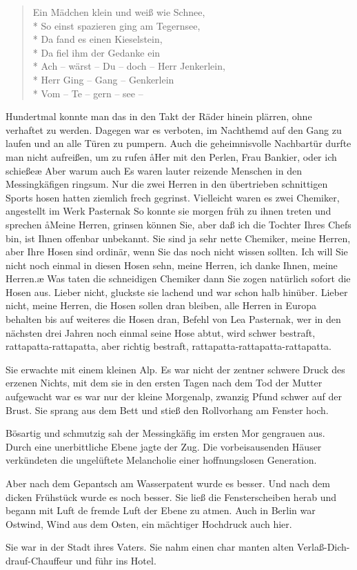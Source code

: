 \begin{verse}Ein Mädchen klein und weiß wie Schnee,\\*
So einst spazieren ging am Tegernsee,\\*
Da fand es einen Kieselstein,\\*
Da fiel ihm der Gedanke ein\dopp{}\\*
Ach -- wärst -- Du -- doch -- Herr Jenkerlein,\\*
Herr Ging -- Gang -- Genkerlein\\*
Vom -- Te -- gern -- see --
\end{verse}

\noindent{}Hundertmal konnte man das in den Takt der Räder hinein\-%
plärren, ohne verhaftet zu werden. Dagegen war es verboten,
im Nachthemd auf den Gang zu laufen und an alle Türen
zu pumpern. Auch die geheimnisvolle Nachbartür durfte
man nicht aufreißen, um zu rufen\dopp{} \aa{}Her mit den Perlen, Frau
Bankier, oder ich schieße\ausr{}\ae{} Aber warum auch\frag{} Es waren
lauter reizende Menschen in den Messingkäfigen ringsum.
Nur die zwei Herren in den übertrieben schnittigen Sports\-%
hosen hatten ziemlich frech gegrinst. Vielleicht waren es zwei
Chemiker, angestellt im Werk Pasternak\frag{} So konnte sie morgen
früh zu ihnen treten und sprechen\dopp{} \aa{}Meine Herren, grinsen
können Sie, aber daß ich die Tochter Ihres Chefs bin, ist
Ihnen offenbar unbekannt. Sie sind ja sehr nette Chemiker,
meine Herren, aber Ihre Hosen sind ordinär, wenn Sie das
noch nicht wissen sollten. Ich will Sie nicht noch einmal in
diesen Hosen sehn, meine Herren, ich danke Ihnen, meine
Herren.\ae{} Was taten die schneidigen Chemiker dann\frag{} Sie
zogen natürlich sofort die Hosen aus. Lieber nicht, gluckste
sie lachend und war schon halb hinüber. Lieber nicht, meine
Herren, die Hosen sollen dran bleiben, alle Herren in Europa
behalten bis auf weiteres die Hosen dran, Befehl von Lea
Pasternak, wer in den nächsten drei Jahren noch einmal seine
Hose abtut, wird schwer bestraft, rattapatta-rattapatta, aber
richtig bestraft, rattapatta-rattapatta-rattapatta.

Sie erwachte mit einem kleinen Alp. Es war nicht der zentner\-%
schwere Druck des erzenen Nichts, mit dem sie in den ersten
Tagen nach dem Tod der Mutter aufgewacht war\semi{} es war
nur der kleine Morgenalp, zwanzig Pfund schwer auf der
Brust. Sie sprang aus dem Bett und stieß den Rollvorhang
am Fenster hoch.

Bösartig und schmutzig sah der Messingkäfig im ersten Mor\-%
gengrauen aus. Durch eine unerbittliche Ebene jagte der Zug.
Die vorbeisausenden Häuser verkündeten die ungelüftete
Melancholie einer hoffnungslosen Generation.

Aber nach dem Gepantsch am Wasserpatent wurde es besser.
Und nach dem dicken Frühstück wurde es noch besser. Sie ließ
die Fensterscheiben herab und begann mit Luft de fremde
Luft der Ebene zu atmen. Auch in Berlin war Ostwind, Wind
aus dem Osten, ein mächtiger Hochdruck auch hier.

Sie war in der Stadt ihres Vaters. Sie nahm einen char\-%
manten alten Verlaß-Dich-drauf-Chauffeur und führ ins
Hotel.